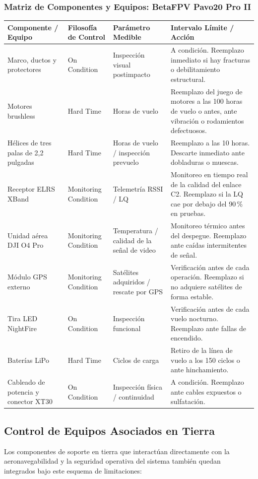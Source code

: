 \subsubsection{Matriz de Componentes y Equipos: BetaFPV Pavo20 Pro II}
\begin{longtable}{|p{}|p{}|p{}|p{}|}
\hline
\rowcolor{gray!30}
\textbf{Componente / Equipo} & \textbf{Filosofía de Control} & \textbf{Parámetro Medible} & \textbf{Intervalo Límite / Acción} \\ \hline
\endhead
Marco, ductos y protectores & On Condition & Inspección visual postimpacto & A condición. Reemplazo inmediato si hay fracturas o debilitamiento estructural. \\ \hline
Motores brushless & Hard Time & Horas de vuelo & Reemplazo del juego de motores a las 100 horas de vuelo o antes, ante vibración o rodamientos defectuosos. \\ \hline
Hélices de tres palas de 2,2 pulgadas & Hard Time & Horas de vuelo / inspección prevuelo & Reemplazo a las 10 horas. Descarte inmediato ante dobladuras o muescas. \\ \hline
Receptor ELRS XBand & Monitoring Condition & Telemetría RSSI / LQ & Monitoreo en tiempo real de la calidad del enlace C2. Reemplazo si la LQ cae por debajo del 90\,\% en pruebas. \\ \hline
Unidad aérea DJI O4 Pro & Monitoring Condition & Temperatura / calidad de la señal de video & Monitoreo térmico antes del despegue. Reemplazo ante caídas intermitentes de señal. \\ \hline
Módulo GPS externo & Monitoring Condition & Satélites adquiridos / rescate por GPS & Verificación antes de cada operación. Reemplazo si no adquiere satélites de forma estable. \\ \hline
Tira LED NightFire & On Condition & Inspección funcional & Verificación antes de cada vuelo nocturno. Reemplazo ante fallas de encendido. \\ \hline
Baterías LiPo & Hard Time & Ciclos de carga & Retiro de la línea de vuelo a los 150 ciclos o ante hinchamiento. \\ \hline
Cableado de potencia y conector XT30 & On Condition & Inspección física / continuidad & A condición. Reemplazo ante cables expuestos o sulfatación. \\ \hline
\end{longtable}

\subsection{Control de Equipos Asociados en Tierra}
Los componentes de soporte en tierra que interactúan directamente con la aeronavegabilidad y la seguridad operativa del sistema también quedan integrados bajo este esquema de limitaciones:


